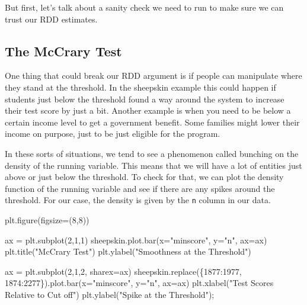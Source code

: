 \documentclass[
  letterpaper,
  DIV=11,
  numbers=noendperiod]{scrreprt}
\newenvironment{Shaded}{\begin{snugshade}}{\end{snugshade}}
\newcommand{\DecValTok}[1]{\textcolor[rgb]{0.68,0.00,0.00}{#1}}
\newcommand{\NormalTok}[1]{\textcolor[rgb]{0.00,0.23,0.31}{#1}}
\newcommand{\OperatorTok}[1]{\textcolor[rgb]{0.37,0.37,0.37}{#1}}
\newcommand{\StringTok}[1]{\textcolor[rgb]{0.13,0.47,0.30}{#1}}
\begin{document}
But first, let's talk about a sanity check we need to run to make sure
we can trust our RDD estimates.

\hypertarget{the-mccrary-test}{%
\subsection{The McCrary Test}\label{the-mccrary-test}}

One thing that could break our RDD argument is if people can manipulate
where they stand at the threshold. In the sheepskin example this could
happen if students just below the threshold found a way around the
system to increase their test score by just a bit. Another example is
when you need to be below a certain income level to get a government
benefit. Some families might lower their income on purpose, just to be
just eligible for the program.

In these sorts of situations, we tend to see a phenomenon called
bunching on the density of the running variable. This means that we will
have a lot of entities just above or just below the threshold. To check
for that, we can plot the density function of the running variable and
see if there are any spikes around the threshold. For our case, the
density is given by the \texttt{n} column in our data.

\begin{Shaded}
\begin{Highlighting}[]
\NormalTok{plt.figure(figsize}\OperatorTok{=}\NormalTok{(}\DecValTok{8}\NormalTok{,}\DecValTok{8}\NormalTok{))}

\NormalTok{ax }\OperatorTok{=}\NormalTok{ plt.subplot(}\DecValTok{2}\NormalTok{,}\DecValTok{1}\NormalTok{,}\DecValTok{1}\NormalTok{)}
\NormalTok{sheepskin.plot.bar(x}\OperatorTok{=}\StringTok{"minscore"}\NormalTok{, y}\OperatorTok{=}\StringTok{"n"}\NormalTok{, ax}\OperatorTok{=}\NormalTok{ax)}
\NormalTok{plt.title(}\StringTok{"McCrary Test"}\NormalTok{)}
\NormalTok{plt.ylabel(}\StringTok{"Smoothness at the Threshold"}\NormalTok{)}

\NormalTok{ax }\OperatorTok{=}\NormalTok{ plt.subplot(}\DecValTok{2}\NormalTok{,}\DecValTok{1}\NormalTok{,}\DecValTok{2}\NormalTok{, sharex}\OperatorTok{=}\NormalTok{ax)}
\NormalTok{sheepskin.replace(\{}\DecValTok{1877}\NormalTok{:}\DecValTok{1977}\NormalTok{, }\DecValTok{1874}\NormalTok{:}\DecValTok{2277}\NormalTok{\}).plot.bar(x}\OperatorTok{=}\StringTok{"minscore"}\NormalTok{, y}\OperatorTok{=}\StringTok{"n"}\NormalTok{, ax}\OperatorTok{=}\NormalTok{ax)}
\NormalTok{plt.xlabel(}\StringTok{"Test Scores Relative to Cut off"}\NormalTok{)}
\NormalTok{plt.ylabel(}\StringTok{"Spike at the Threshold"}\NormalTok{)}\OperatorTok{;}
\end{Highlighting}
\end{Shaded}
\end{document}

